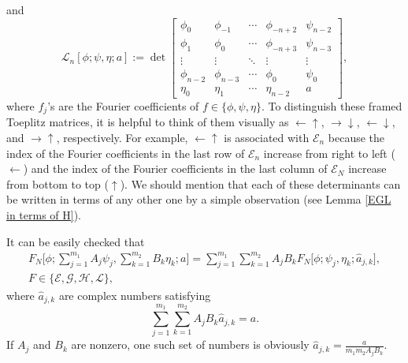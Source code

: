 \documentclass[pdftex]{sigma}
\numberwithin{equation}{section}
\begin{document}
		and
		\begin{equation}\label{half-framed 3}
			\mathscr{L}_n[\phi;\psi,\eta;a] := \det \begin{bmatrix}
				\phi_0& \phi_{-1} & \cdots & \phi_{-n+2} & \psi_{n-2} \\
				\phi_{1}& \phi_0 & \cdots & \phi_{-n+3} & \psi_{n-3} \\
				\vdots & \vdots & \ddots & \vdots & \vdots \\
				\phi_{n-2} & \phi_{n-3} & \cdots & \phi_{0} & \psi_{0} \\
				\eta_{0} & \eta_{1} & \cdots & \eta_{n-2} & a
			\end{bmatrix},
		\end{equation}
		where $f_j$'s are the Fourier coefficients of $f \in \{ \phi, \psi, \eta \}$. To distinguish these framed Toeplitz matrices, it is helpful to think of them visually as $ \leftarrow \uparrow$, $\rightarrow \downarrow$, $\leftarrow \downarrow $, and $\rightarrow \uparrow$, respectively. For example, $\leftarrow \uparrow$ is associated with $\mathscr{E}_n$ because the index of the Fourier coefficients in the last row of $\boldsymbol{\mathscr{E}}_n$ increase from right to left ($\leftarrow$) and the index of the Fourier coefficients in the last column of $\boldsymbol{\mathscr{E}}_N$ increase from bottom to top ($\uparrow$). We should mention that each of these determinants can be written in terms of any other one by a simple observation (see Lemma \ref{EGL in terms of H}).
		
		It can be easily checked that
		\begin{gather}
			F_N\Bigg[\phi; \sum_{j=1}^{m_1} A_j \psi_j,\sum_{k=1}^{m_2} B_k \eta_k;a\Bigg] = \sum_{j=1}^{m_1} \sum_{k=1}^{m_2} A_j B_k F_N\big[\phi; \psi_j, \eta_k; \widehat{a}_{j,k} \big],\nonumber \\
 F \in \{\mathscr{E},\mathscr{G}, \mathscr{H}, \mathscr{L}\},\label{framed lin comb}
		\end{gather}
		where
		$\widehat{a}_{j,k}$ are complex numbers satisfying
		\begin{equation}\label{framed lin comb1}
			\sum_{j=1}^{m_1} \sum_{k=1}^{m_2} A_j B_k \widehat{a}_{j,k}= a.
		\end{equation}
		If $A_j$ and $B_k$ are nonzero, one such set of numbers is obviously
$\widehat{a}_{j,k} = \frac{a}{m_1m_2A_jB_k}$.
		
	
		
\end{document}
